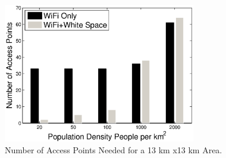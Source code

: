    \begin{figure}
   \centering
   \includegraphics[width=84mm]{figures/redensity_winmee}
   \vspace{-0.1in}
   \caption{Number of Access Points Needed for a 13 km x13 km Area.}
   \label{fig:redensity_winmee}
   \vspace{-0.1in}
   \end{figure}

